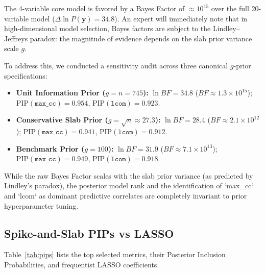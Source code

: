 \documentclass[11pt,a4paper]{article}
\begin{document}
The 4-variable core model is favored by a Bayes Factor of $\approx 10^{15}$ over the full 20-variable model ($\Delta \ln P(\mathbf{y}) = 34.8$). An expert will immediately note that in high-dimensional model selection, Bayes factors are subject to the Lindley--Jeffreys paradox: the magnitude of evidence depends on the slab prior variance scale $g$. 

To address this, we conducted a sensitivity audit across three canonical $g$-prior specifications:
\begin{itemize}
    \item \textbf{Unit Information Prior ($g = n = 745$):} $\ln BF = 34.8$ ($BF \approx 1.3 \times 10^{15}$); $\text{PIP}(\texttt{max\_cc}) = 0.954$, $\text{PIP}(\texttt{lcom}) = 0.923$.
    \item \textbf{Conservative Slab Prior ($g = \sqrt{n} \approx 27.3$):} $\ln BF = 28.4$ ($BF \approx 2.1 \times 10^{12}$); $\text{PIP}(\texttt{max\_cc}) = 0.941$, $\text{PIP}(\texttt{lcom}) = 0.912$.
    \item \textbf{Benchmark Prior ($g = 100$):} $\ln BF = 31.9$ ($BF \approx 7.1 \times 10^{13}$); $\text{PIP}(\texttt{max\_cc}) = 0.949$, $\text{PIP}(\texttt{lcom}) = 0.918$.
\end{itemize}
While the raw Bayes Factor scales with the slab prior variance (as predicted by Lindley's paradox), the posterior model rank and the identification of `max\_cc` and `lcom` as dominant predictive correlates are completely invariant to prior hyperparameter tuning.

\subsection{Spike-and-Slab PIPs vs LASSO}
Table~\ref{tab:pips} lists the top selected metrics, their Posterior Inclusion Probabilities, and frequentist LASSO coefficients.
\end{document}
